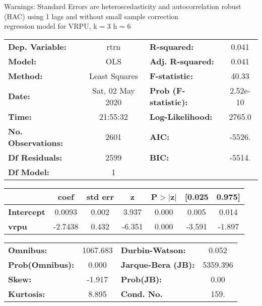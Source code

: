 Warnings: \newline
 [1] Standard Errors are heteroscedasticity and autocorrelation robust (HAC) using 1 lags and without small sample correction\\ 

regression model for VRPU, k = 3 h = 6\begin{center}
\begin{tabular}{lclc}
\toprule
\textbf{Dep. Variable:}    &       rtrn       & \textbf{  R-squared:         } &     0.041   \\
\textbf{Model:}            &       OLS        & \textbf{  Adj. R-squared:    } &     0.041   \\
\textbf{Method:}           &  Least Squares   & \textbf{  F-statistic:       } &     40.33   \\
\textbf{Date:}             & Sat, 02 May 2020 & \textbf{  Prob (F-statistic):} &  2.52e-10   \\
\textbf{Time:}             &     21:55:32     & \textbf{  Log-Likelihood:    } &    2765.0   \\
\textbf{No. Observations:} &        2601      & \textbf{  AIC:               } &    -5526.   \\
\textbf{Df Residuals:}     &        2599      & \textbf{  BIC:               } &    -5514.   \\
\textbf{Df Model:}         &           1      & \textbf{                     } &             \\
\bottomrule
\end{tabular}
\begin{tabular}{lcccccc}
                   & \textbf{coef} & \textbf{std err} & \textbf{z} & \textbf{P$> |$z$|$} & \textbf{[0.025} & \textbf{0.975]}  \\
\midrule
\textbf{Intercept} &       0.0093  &        0.002     &     3.937  &         0.000        &        0.005    &        0.014     \\
\textbf{vrpu}      &      -2.7438  &        0.432     &    -6.351  &         0.000        &       -3.591    &       -1.897     \\
\bottomrule
\end{tabular}
\begin{tabular}{lclc}
\textbf{Omnibus:}       & 1067.683 & \textbf{  Durbin-Watson:     } &    0.052  \\
\textbf{Prob(Omnibus):} &   0.000  & \textbf{  Jarque-Bera (JB):  } & 5359.396  \\
\textbf{Skew:}          &  -1.917  & \textbf{  Prob(JB):          } &     0.00  \\
\textbf{Kurtosis:}      &   8.895  & \textbf{  Cond. No.          } &     159.  \\
\bottomrule
\end{tabular}
\end{center}

